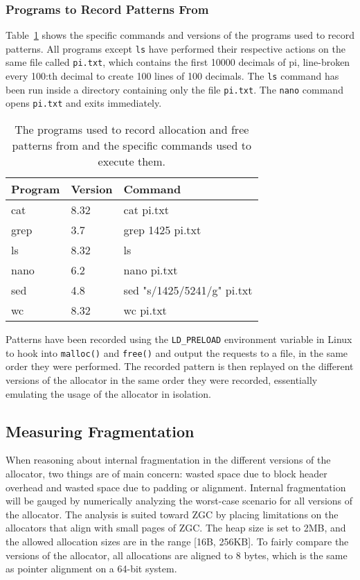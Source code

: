 \subsubsection{Programs to Record Patterns From}

Table~\ref{table:pattern-programs} shows the specific commands and versions of the programs used to record patterns. All programs except \texttt{ls} have performed their respective actions on the same file called \texttt{pi.txt}, which contains the first 10000 decimals of pi, line-broken every 100:th decimal to create 100 lines of 100 decimals. The \texttt{ls} command has been run inside a directory containing only the file \texttt{pi.txt}. The \texttt{nano} command opens \texttt{pi.txt} and exits immediately.

\begin{table}[H]
\centering
\begin{tabular}{llp{10.4cm}}
\textbf{Program} & \textbf{Version} & \textbf{Command} \\ \hline
cat  & 8.32 & cat pi.txt\\ \hline
grep & 3.7  & grep 1425 pi.txt\\ \hline
ls   & 8.32 & ls \\ \hline
nano & 6.2  & nano pi.txt\\ \hline
sed  & 4.8  & sed "s/1425/5241/g" pi.txt\\ \hline
wc   & 8.32 & wc pi.txt\\
\end{tabular}
\caption{The programs used to record allocation and free patterns from and the specific commands used to execute them.}
\label{table:pattern-programs}
\end{table}

Patterns have been recorded using the \texttt{LD\_PRELOAD} environment variable in Linux to hook into \texttt{malloc()} and \texttt{free()} and output the requests to a file, in the same order they were performed. The recorded pattern is then replayed on the different versions of the allocator in the same order they were recorded, essentially emulating the usage of the allocator in isolation.

\subsection{Measuring Fragmentation}

When reasoning about internal fragmentation in the different versions of the allocator, two things are of main concern: wasted space due to block header overhead and wasted space due to padding or alignment. Internal fragmentation will be gauged by numerically analyzing the worst-case scenario for all versions of the allocator. The analysis is suited toward ZGC by placing limitations on the allocators that align with small pages of ZGC. The heap size is set to 2MB, and the allowed allocation sizes are in the range [16B, 256KB]. To fairly compare the versions of the allocator, all allocations are aligned to 8 bytes, which is the same as pointer alignment on a 64-bit system.

